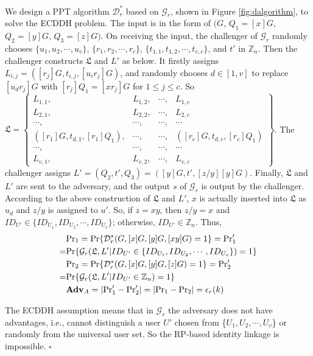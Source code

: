 We design a PPT algorithm $\mathcal{D}^*_r$ based on $\mathcal{G}_r$, shown in Figure \ref{fig:dalgorithm}, to solve the ECDDH problem.
The input is in the form of $(G$, $Q_1=[x]G$, $Q_2=[y]G$, $Q_3=[z]G)$.
On receiving the input, the challenger of $\mathcal{G}_r$ randomly chooses
 $\{u_1, u_2, \cdots, u_v\}$, $\{r_1, r_2, \cdots, r_c\}$, $\{t_{1, 1}, t_{1, 2}, \cdots, t_{v, c}\}$, and $t'$ in $\mathbb{Z}_n$.
Then the challenger constructs $\mathfrak{L}$ and $L'$ as below.
It firstly assigns $L_{i, j} = ([r_j]G, t_{i, j}, [u_ir_j]G)$, %
    and randomly chooses $d \in [1, v]$ to
 replace $[u_d r_j]G$ with $[r_j]Q_1=[xr_j]G$ for $1\leq j \leq c$.
So $\mathfrak{L}=\left \{ \begin{matrix}
L_{1,1},&L_{1,2},&\cdots,&L_{1,c}\\
L_{2,1},& L_{2,2},&\cdots,&L_{2,c}\\
\cdots,&\cdots,&\cdots,&\cdots\\
([r_{1}]G, t_{d, 1}, [r_{1}]Q_1),&\cdots,&\cdots,&([r_{c}]G, t_{d, c}, [r_{c}]Q_1)\\
\cdots,&\cdots,&\cdots,&\cdots\\
L_{v,1},&L_{v,2},&\cdots,&L_{v,c}
\end{matrix}\right\}$.
%
The challenger assigns $L' = (Q_2, t', Q_3) = ([y]G, t', [z/y][y]G)$.
Finally,
    $\mathfrak{L}$ and $L'$ are sent to the adversary,
        and the output $s$ of $\mathcal{G}_r$ is output by the challenger.
According to the above construction of $\mathfrak{L}$ and $L'$,
    $x$ is actually inserted into $\mathfrak{L}$ as $u_d$
    and $z/y$ is assigned to $u'$.
So, if $z = xy$, then $z/y=x$ and $ID_{U'} \in \{ID_{U_1}, ID_{U_2}, \cdots, ID_{U_v}\}$;
    otherwise, $ID_{U'} \in \mathbb{Z}_n$.
Thus,
\begin{align*}
&{\rm Pr}_1={\rm Pr}\{\mathcal{D}^*_r(G, [x]G, [y]G, [xy]G)=1\}={\rm Pr}'_1 \\=&  {\rm Pr}\{\mathcal{G}_r(\mathfrak{L}, L'|ID_{U'} \in \{ID_{U_1}, ID_{U_2}, \cdots, ID_{U_v}\})=1\} \\
&{\rm Pr}_2={\rm Pr}\{\mathcal{D}^*_r(G, [x]G, [y]G, [z]G)=1\} ={\rm Pr}'_2 \\=&  {\rm Pr}\{\mathcal{G}_r(\mathfrak{L}, L'|ID_{U'} \in \mathbb{Z}_n)=1\}\\
&{\mathbf{Adv}}_{A}=|{\rm Pr}'_1-{\rm Pr}'_2|=|{\rm Pr}_1-{\rm Pr}_2|=\epsilon_{r}(k)
\end{align*}

The ECDDH assumption means that in $\mathcal{G}_r$ the adversary does not have advantages,
    i.e., cannot distinguish a user $U'$ chosen from \{${U_1}, {U_2}, \cdots, {U_v}$\}
        or randomly from the universal user set.
So the RP-based identity linkage is impossible. $\square$

